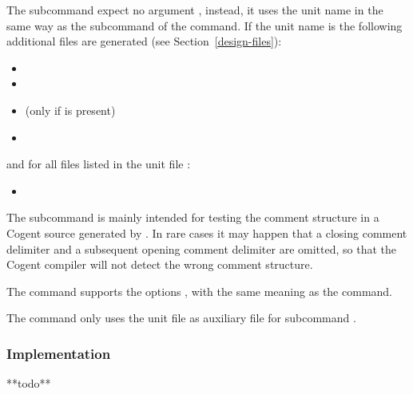 The subcommand  expect no argument , instead, it uses the unit name in the same way as the subcommand  
of the  command. If the unit name is  the following additional files are generated 
(see Section~\ref{design-files}):
\begin{itemize}
\item {}
\item {}
\item {} (only if  is present)
\item {}
\end{itemize}
and for all files  listed in the unit file :
\begin{itemize}
\item {}
\end{itemize}

The subcommand  is mainly intended for testing the comment structure in a Cogent source generated by
. In rare cases it may happen that a closing comment delimiter and a subsequent opening comment delimiter
are omitted, so that the Cogent compiler will not detect the wrong comment structure.

The  command supports the options ,  with the same meaning as
the  command.

The  command only uses the unit file  as auxiliary file for subcommand .

\subsubsection{Implementation}

**todo**

